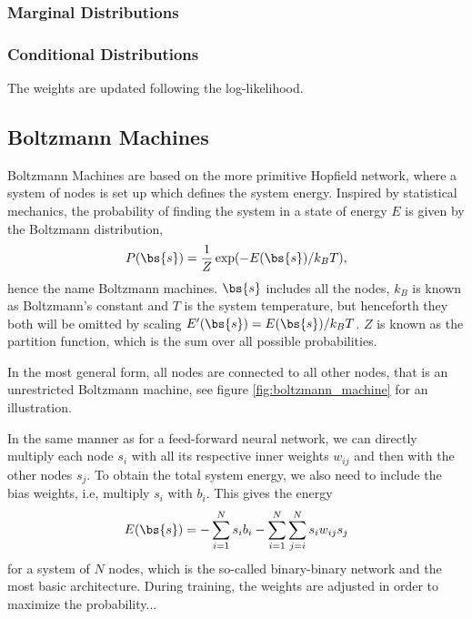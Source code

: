 \subsubsection{Marginal Distributions}

\subsubsection{Conditional Distributions}

The weights are updated following the log-likelihood. 

\subsection{Boltzmann Machines}
Boltzmann Machines are based on the more primitive Hopfield network, where a system of nodes is set up which defines the system energy. Inspired by statistical mechanics, the probability of finding the system in a state of energy $E$ is given by the Boltzmann distribution,
\begin{equation}
P(\bs{s})=\frac{1}{Z}\exp(-E(\bs{s})/k_BT),
\label{eq:boltzmanndist}
\end{equation}
hence the name Boltzmann machines.  $\bs{s}$ includes all the nodes, $k_B$ is known as Boltzmann's constant and $T$ is the system temperature, but henceforth they both will be omitted by scaling $E'(\bs{s})=E(\bs{s})/k_BT$. $Z$ is known as the partition function, which is the sum over all possible probabilities.

In the most general form, all nodes are connected to all other nodes, that is an unrestricted Boltzmann machine, see figure \eqref{fig:boltzmann_machine} for an illustration. 



In the same manner as for a feed-forward neural network, we can directly multiply each node $s_i$ with all its respective inner weights $w_{ij}$ and then with the other nodes $s_j$. To obtain the total system energy, we also need to include the bias weights, i.e, multiply $s_i$ with $b_i$. This gives the energy
\begin{equation}
E(\bs{s})=- \sum_{i=1}^Ns_ib_i-\sum_{i=1}^N\sum_{j=i}^N s_iw_{ij}s_j 
\label{eq:unrestrictedboltzmannmachine}
\end{equation}
for a system of $N$ nodes, which is the so-called binary-binary network and the most basic architecture. During training, the weights are adjusted in order to maximize the probability...

